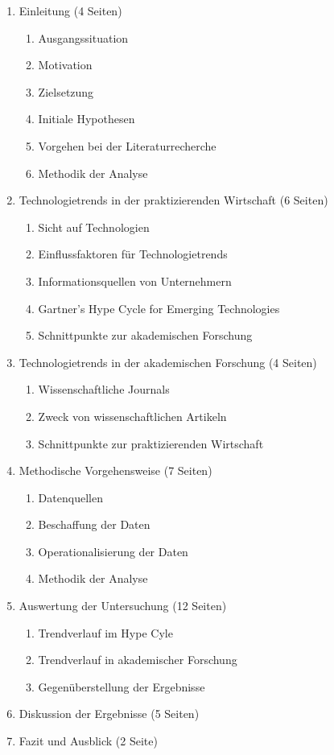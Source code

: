 \begin{enumerate}
	\item Einleitung (4 Seiten)
	\begin{enumerate}
		\item Ausgangssituation
		\item Motivation
		\item Zielsetzung
		\item Initiale Hypothesen
		\item Vorgehen bei der Literaturrecherche
		\item Methodik der Analyse
	\end{enumerate}
	\item Technologietrends in der praktizierenden Wirtschaft (6 Seiten)
	\begin{enumerate}
		\item Sicht auf Technologien
		\item Einflussfaktoren für Technologietrends
		\item Informationsquellen von Unternehmern
		\item Gartner's Hype Cycle for Emerging Technologies
		\item Schnittpunkte zur akademischen Forschung
	\end{enumerate}
	\item Technologietrends in der akademischen Forschung (4 Seiten)
	\begin{enumerate}
		\item Wissenschaftliche Journals
		\item Zweck von wissenschaftlichen Artikeln
		\item Schnittpunkte zur praktizierenden Wirtschaft
	\end{enumerate}
	\item Methodische Vorgehensweise (7 Seiten)
	\begin{enumerate}
		\item Datenquellen
		\item Beschaffung der Daten
		\item Operationalisierung der Daten
		\item Methodik der Analyse
	\end{enumerate}
	\item Auswertung der Untersuchung (12 Seiten)
	\begin{enumerate}
		\item Trendverlauf im Hype Cyle
		\item Trendverlauf in akademischer Forschung
		\item Gegenüberstellung der Ergebnisse
	\end{enumerate}
	\item Diskussion der Ergebnisse (5 Seiten)
	\item Fazit und Ausblick (2 Seite)
\end{enumerate}

